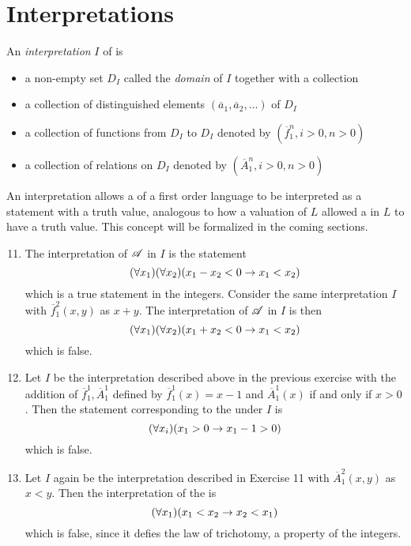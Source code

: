 \section{Interpretations}

\setcounter{definition}{13}
\begin{definition}
An \textit{interpretation} \(I\) of \cl is
  \begin{itemize}
    \item a non-empty set \(D_I\) called the \textit{domain} of \(I\) together with a collection 
    \item a collection of distinguished elements \((\overline{a}_1, \overline{a}_2, \dots)\) of \(D_I\)
    \item a collection of functions from \(D_I\) to \(D_I\) denoted by \((\overline{f}^n_1, i> 0, n>0)\)
    \item a collection of relations on \(D_I\) denoted by \((\overline{A}^n_1, i> 0, n>0)\)
  \end{itemize}
\end{definition}

An interpretation allows a \wf{} of a first order language to be interpreted as a statement with a truth value, analogous to how a valuation of \(L\) allowed a \wf{} in \(L\) to have a truth value. This concept will be formalized in the coming sections.

\solutions{}

\begin{enumerate}
  \setcounter{enumi}{10}
  \item The interpretation of \(\mathscr{A}\) in \(I\) is the statement
    \[(\forall x_1) (\forall x_2) (x_1 - x_2 < 0 \rightarrow x_1 < x_2)\]
    which is a true statement in the integers. Consider the same interpretation \(I\) with \(\overline{f}^2_1(x, y)\) as \(x + y\). The interpretation of \(\mathscr{A}\) in \(I\) is then
    \[(\forall x_1) (\forall x_2) (x_1 + x_2 < 0 \rightarrow x_1 < x_2)\]
    which is false.

  \item Let \(I\) be the interpretation described above in the previous exercise with the addition of \(\overline{f}^1_1, \overline{A}^1_1\) defined by \(\overline{f}^1_1(x) = x - 1\) and \(\overline{A}^1_1(x)\) if and only if \(x > 0\). Then the statement corresponding to the \wf{} under \(I\) is
    \[(\forall x_i)(x_1 > 0 \rightarrow x_1 - 1 > 0)\]
    which is false.

  \item Let \(I\) again be the interpretation described in Exercise 11 with \(\overline{A}^2_1(x, y)\) as \(x < y\). Then the interpretation of the \wf{} is
    \[(\forall x_1)(x_1 < x_2 \rightarrow x_2 < x_1)\]
    which is false, since it defies the law of trichotomy, a property of the integers.
\end{enumerate}
